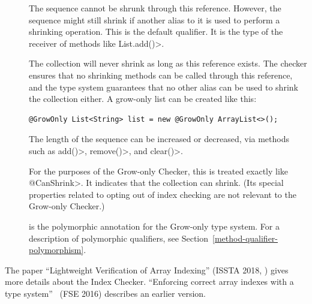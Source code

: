 \begin{description}
\item[]
  The sequence cannot be shrunk through this reference. However, the sequence
  might still shrink if another alias to it is used to perform a shrinking
  operation. This is the default qualifier.  It is the type of the receiver of
  methods like \<List.add()>.

\item[]
  The collection will never shrink as long as
  this reference exists. The checker ensures that no shrinking methods can be
  called through this reference, and the type system guarantees that no other
  alias can be used to shrink the collection either.  A grow-only list can be
  created like this:
\begin{Verbatim}
@GrowOnly List<String> list = new @GrowOnly ArrayList<>();
\end{Verbatim}

\item[]
  The length of the sequence can be increased or decreased, via methods such as
  \<add()>, \<remove()>, and \<clear()>.

\item[]
  For the purposes of the Grow-only Checker, this is treated exactly like
  \<@CanShrink>. It indicates that the collection can shrink. (Its special
  properties related to opting out of index checking are not relevant to the
  Grow-only Checker.)

\item[]
  is the polymorphic annotation for the Grow-only type system.
  For a description of polymorphic qualifiers, see
  Section~\ref{method-qualifier-polymorphism}.

\end{description}
\fi %


The paper ``Lightweight Verification of Array Indexing'' (ISSTA 2018,
)
gives more details about the Index Checker.
``Enforcing correct array indexes with a type system''~\cite{Santino2016} (FSE 2016) describes
an earlier version.


